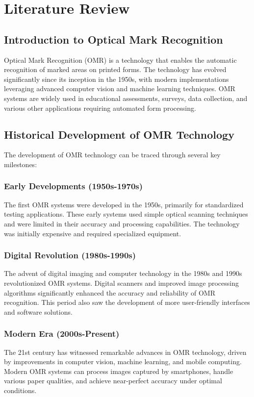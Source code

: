 \chapter{Literature Review}
\label{ch:literature_review}

\section{Introduction to Optical Mark Recognition}

Optical Mark Recognition (OMR) is a technology that enables the automatic recognition of marked areas on printed forms. The technology has evolved significantly since its inception in the 1950s, with modern implementations leveraging advanced computer vision and machine learning techniques. OMR systems are widely used in educational assessments, surveys, data collection, and various other applications requiring automated form processing.

\section{Historical Development of OMR Technology}

The development of OMR technology can be traced through several key milestones:

\subsection{Early Developments (1950s-1970s)}
The first OMR systems were developed in the 1950s, primarily for standardized testing applications. These early systems used simple optical scanning techniques and were limited in their accuracy and processing capabilities. The technology was initially expensive and required specialized equipment.

\subsection{Digital Revolution (1980s-1990s)}
The advent of digital imaging and computer technology in the 1980s and 1990s revolutionized OMR systems. Digital scanners and improved image processing algorithms significantly enhanced the accuracy and reliability of OMR recognition. This period also saw the development of more user-friendly interfaces and software solutions.

\subsection{Modern Era (2000s-Present)}
The 21st century has witnessed remarkable advances in OMR technology, driven by improvements in computer vision, machine learning, and mobile computing. Modern OMR systems can process images captured by smartphones, handle various paper qualities, and achieve near-perfect accuracy under optimal conditions.

